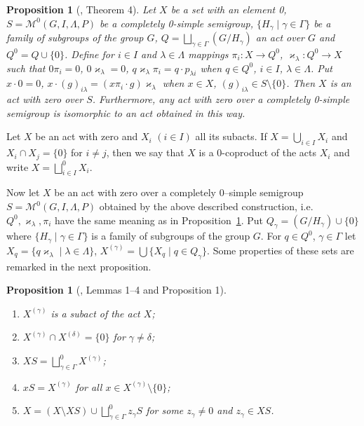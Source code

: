 \documentclass{birkau}
\numberwithin{equation}{section}
\theoremstyle{plain}
\newtheorem{proposition}[theorem]{Proposition}
\theoremstyle{definition}
\begin{document}
	\begin{proposition}[\cite{avdeev}, Theorem 4] \label{pr02}
	    Let $X$ be a set with an element 0, $S=\mathcal{M}^0(G,I,\Lambda,P)$ be a completely 0-simple semigroup, $\{ H_\gamma \mid \gamma \in \Gamma \}$ be a family of subgroups of the group $G$, $ Q = \bigsqcup_{\gamma \in \Gamma} (G/H_\gamma) $ an act over $G$ and $Q^0 = Q \cup \{0\}$. Define for $i \in I$ and $\lambda \in \Lambda$ mappings $\pi_i:X \rightarrow Q^0$, $\varkappa_\lambda: Q^0 \rightarrow X$ such that $0\pi_i = 0$, $0\varkappa_\lambda = 0$, $q \varkappa_\lambda \pi_i = q \cdot p_{\lambda i}$ when $ q \in Q^0$, $i \in I$, $\lambda \in \Lambda$. Put $x \cdot 0 = 0$, $x \cdot (g)_{i \lambda} = (x \pi_i \cdot g)\varkappa_{\lambda}$ when $x \in X$, $(g)_{i \lambda} \in S \setminus \{0\}$. Then $X$ is an act with zero over $S$. Furthermore, any act with zero over a completely 0-simple semigroup is isomorphic to an act obtained in this way.
	\end{proposition}
	
	Let $X$ be an act with zero and $X_i$ $(i \in I)$ all its subacts. If $X = \bigcup_{i \in I} X_i$ and $X_i \cap X_j = \{0\}$ for $i \neq j$, then we say that $X$ is a 0-coproduct of the acts $X_i$ and write $X = \bigsqcup_{i \in I}^0 X_i$.
	
	Now let $X$ be an act with zero over a completely 0--simple semigroup $S=\mathcal{M}^0(G,I,\Lambda,P)$ obtained by the above described construction, i.e. $Q^0,\varkappa_\lambda,\pi_i$ have the same meaning as in Proposition~\ref{pr02}. Put $Q_\gamma = (G/H_\gamma) \cup \{0\}$ where $\{ H_\gamma \mid \gamma \in \Gamma \}$ is a family of subgroups of the group $G$. For $q \in Q^0$, $\gamma \in \Gamma$ let $X_q = \{q\varkappa_\lambda \mid \lambda \in \Lambda \}$, $X^{(\gamma)} = \bigcup\{X_q \mid q \in Q_{\gamma}\}$. Some properties of these sets are remarked in the next proposition.
	
	\begin{proposition}[\cite{avdeev}, Lemmas 1--4 and Proposition 1] \label{pr03}
		\
		\begin{enumerate}
			\item[(1)] $X^{(\gamma)}$ is a subact of the act $X$;
			\item[(2)] $X^{(\gamma)} \cap X^{(\delta)} = \{0\}$ for $\gamma \neq \delta$;
			\item[(3)] $XS = \bigsqcup_{\gamma \in \Gamma}^0 X^{(\gamma)}$;
			\item[(4)] $xS = X^{(\gamma)}$ for all $x \in X^{(\gamma)} \setminus \{0\}$;
			\item[(5)] $X = (X \setminus XS) \cup \bigsqcup_{\gamma \in \Gamma}^0 z_{\gamma} S $ for some $z_\gamma \neq 0$ and $z_\gamma \in XS$.
		\end{enumerate}
	\end{proposition}
	
\end{document}
